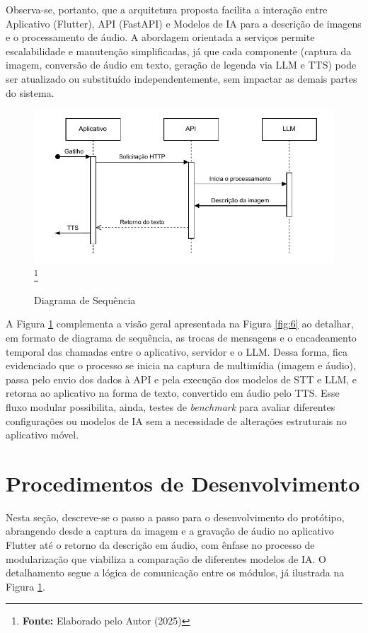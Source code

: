 Observa-se, portanto, que a arquitetura proposta facilita a interação entre Aplicativo (Flutter), API (FastAPI) e Modelos de IA para a descrição de imagens e o processamento de áudio. A abordagem orientada a serviços permite escalabilidade e manutenção simplificadas, já que cada componente (captura da imagem, conversão de áudio em texto, geração de legenda via LLM e TTS) pode ser atualizado ou substituído independentemente, sem impactar as demais partes do sistema.

\begin{figure}[!h]
     \caption{Diagrama de Sequência}
     \centering
     \includegraphics[width=0.7\linewidth]{imagens/diagrama_sequencia.drawio.pdf}
     \label{fig:7}
     \footnote{\textbf{Fonte:} Elaborado pelo Autor (2025)}
\end{figure}

A Figura \ref{fig:7} complementa a visão geral apresentada na Figura \ref{fig:6} ao detalhar, em formato de diagrama de sequência, as trocas de mensagens e o encadeamento temporal das chamadas entre o aplicativo, servidor e o LLM. Dessa forma, fica evidenciado que o processo se inicia na captura de multimídia (imagem e áudio), passa pelo envio dos dados à API e pela execução dos modelos de STT e LLM, e retorna ao aplicativo na forma de texto, convertido em áudio pelo TTS. Esse fluxo modular possibilita, ainda, testes de \textit{benchmark} para avaliar diferentes configurações ou modelos de IA sem a necessidade de alterações estruturais no aplicativo móvel.

\section{Procedimentos de Desenvolvimento}

Nesta seção, descreve-se o passo a passo para o desenvolvimento do protótipo, abrangendo desde a captura da imagem e a gravação de áudio no aplicativo Flutter até o retorno da descrição em áudio, com ênfase no processo de modularização que viabiliza a comparação de diferentes modelos de IA. O detalhamento segue a lógica de comunicação entre os módulos, já ilustrada na Figura \ref{fig:7}.

